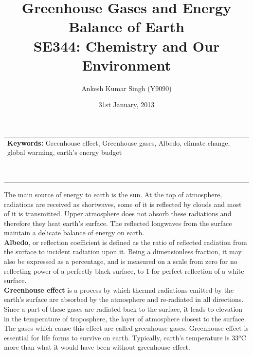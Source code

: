 \documentclass[pdftex,11pt,a4paper]{article}
\title{\vspace{-15pt}Greenhouse Gases and Energy Balance of Earth\\ SE344: Chemistry and Our Environment}
\author{Ankesh Kumar Singh (Y9090)}
\date{31st January, 2013}
\begin{document}
\maketitle
\begin{tabular}{p{370pt}}
\textbf{Keywords: }Greenhouse effect, Greenhouse gases, Albedo, climate change, global warming, earth's energy budget
\end{tabular}
\vspace{10pt}\\
\hrule
\vspace{10pt}
The main source of energy to earth is the sun. At the top of atmosphere, radiations are received as shortwaves, some of it is reflected by clouds and most of it is transmitted. Upper atmosphere does not absorb these radiations and therefore they heat earth’s surface. The reflected longwaves from the surface maintain a delicate balance of energy on earth.\\

\textbf{Albedo}, or reflection coefficient is defined as the ratio of reflected radiation from the surface to incident radiation upon it. Being a dimensionless fraction, it may also be expressed as a percentage, and is measured on a scale from zero for no reflecting power of a perfectly black surface, to 1 for perfect reflection of a white surface.\\

\textbf{Greenhouse effect} is a process by which thermal radiations emitted by the earth’s surface are absorbed by the atmosphere and re-radiated in all directions. Since a part of these gases are radiated back to the surface, it leads to elevation in the temperature of troposphere, the layer of atmosphere closest to the surface. The gases which cause this effect are called greenhouse gases. Greenhouse effect is essential for life forms to survive on earth. Typically, earth’s temperature is 33$^o$C more than what it would have been without greenhouse effect.\\
\end{document}
